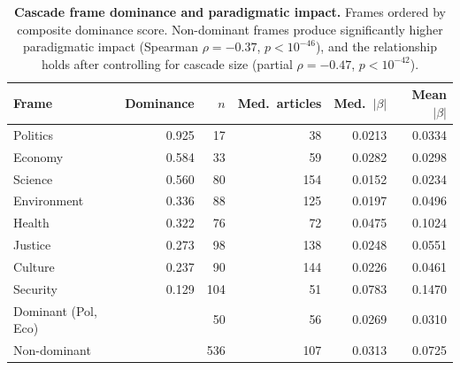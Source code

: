 \begin{table}[h]
\centering
\renewcommand{\arraystretch}{1.15}
\caption{\textbf{Cascade frame dominance and paradigmatic impact.}
Frames ordered by composite dominance score.
Non-dominant frames produce significantly higher paradigmatic impact
(Spearman $\rho = -0.37$, $p < 10^{-46}$),
and the relationship holds after controlling for cascade size
(partial $\rho = -0.47$, $p < 10^{-42}$).}
\label{tab:si_dominance_impact}
\vspace{0.3em}
\small
\begin{tabular}{@{}l r r r r r@{}}
\toprule
Frame & Dominance & $n$ & Med.\ articles & Med.\ $|\beta|$ & Mean $|\beta|$ \\
\midrule
Politics & 0.925 & 17 & 38 & 0.0213 & 0.0334 \\
Economy & 0.584 & 33 & 59 & 0.0282 & 0.0298 \\
Science & 0.560 & 80 & 154 & 0.0152 & 0.0234 \\
Environment & 0.336 & 88 & 125 & 0.0197 & 0.0496 \\
Health & 0.322 & 76 & 72 & 0.0475 & 0.1024 \\
Justice & 0.273 & 98 & 138 & 0.0248 & 0.0551 \\
Culture & 0.237 & 90 & 144 & 0.0226 & 0.0461 \\
Security & 0.129 & 104 & 51 & 0.0783 & 0.1470 \\
\midrule
Dominant (Pol, Eco) & & 50 & 56 & 0.0269 & 0.0310 \\
Non-dominant & & 536 & 107 & 0.0313 & 0.0725 \\
\bottomrule
\end{tabular}
\end{table}